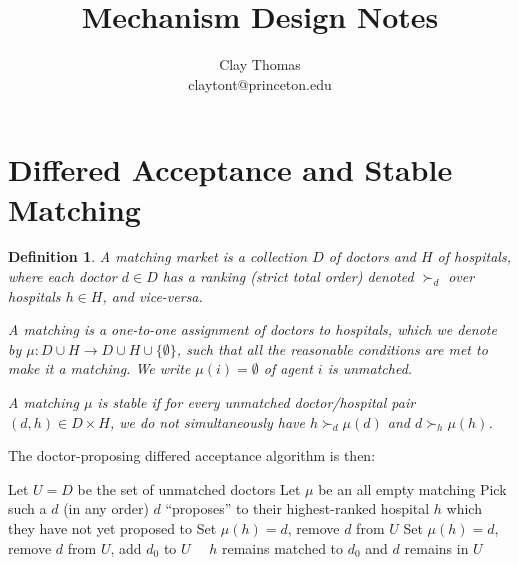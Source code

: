 \documentclass[12pt]{article}
\newtheorem{definition}{Definition}[section]
\begin{document}
 
\title{Mechanism Design Notes}
\author{Clay Thomas\\
claytont@princeton.edu}
\maketitle

\clearpage
\section{Differed Acceptance and Stable Matching}

\begin{definition}
  A matching market is a collection $D$ of doctors and $H$ of hospitals, where
  each doctor $d\in D$ has a ranking (strict total order) denoted $\succ_d$ 
  over hospitals $h\in H$, and vice-versa.

  A matching is a one-to-one assignment of doctors to hospitals, which we denote
  by $\mu : D\cup H\to D\cup H\cup\{\emptyset\}$, such that all the reasonable
  conditions are met to make it a matching. We write $\mu(i) = \emptyset$ of
  agent $i$ is unmatched.

  A matching $\mu$ is \emph{stable} if for every unmatched doctor/hospital pair 
  $(d,h)\in D\times H$, we do not simultaneously have
  $h \succ_d \mu(d)$ and $d \succ_h \mu(h)$.

\end{definition}

The doctor-proposing differed acceptance algorithm is then:
\begin{algorithm}
\begin{algorithmic}[0]
  \State Let $U = D$ be the set of unmatched doctors
  \State Let $\mu$ be an all empty matching
    \State Pick such a $d$ (in any order)
    \State $d$ ``proposes'' to their highest-ranked hospital $h$ which 
      they have not yet proposed to
      \State Set $\mu(h) = d$, remove $d$ from $U$ 
    \EndIf
      \State Set $\mu(h) = d$, remove $d$ from $U$, add $d_0$ to $U$
      \Else \ \ $h$ remains matched to $d_0$ and $d$ remains in $U$
    \EndIf
  \EndWhile
\end{algorithmic}
\end{algorithm}
\end{document}
